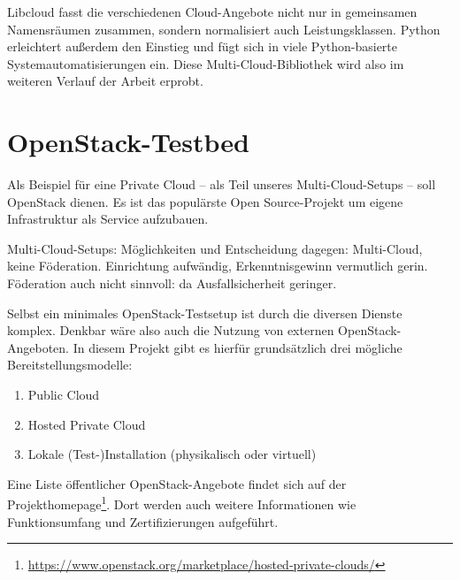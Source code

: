 \noindent Libcloud fasst die verschiedenen Cloud-Angebote nicht nur in gemeinsamen Namensräumen zusammen, sondern normalisiert auch Leistungsklassen. Python erleichtert außerdem den Einstieg und fügt sich in viele Python-basierte Systemautomatisierungen ein. Diese Multi-Cloud-Bibliothek wird also im weiteren Verlauf der Arbeit erprobt.


\section{OpenStack-Testbed}

Als Beispiel für eine Private Cloud -- als Teil unseres Multi-Cloud-Setups -- soll OpenStack dienen. Es ist das populärste Open Source-Projekt um eigene Infrastruktur als Service aufzubauen. 


Multi-Cloud-Setups: Möglichkeiten und Entscheidung dagegen: Multi-Cloud, keine Föderation. Einrichtung aufwändig, Erkenntnisgewinn vermutlich gerin. Föderation auch nicht sinnvoll: da Ausfallsicherheit geringer.\todo{}

Selbst ein minimales OpenStack-Testsetup ist durch die diversen Dienste komplex. Denkbar wäre also auch die Nutzung von externen OpenStack-Angeboten. In diesem Projekt gibt es hierfür grundsätzlich drei mögliche Bereitstellungsmodelle:

\begin{enumerate}
	\item Public Cloud
	\item Hosted Private Cloud
	\item Lokale (Test-)Installation (physikalisch oder virtuell)
\end{enumerate}

\noindent Eine Liste öffentlicher OpenStack-Angebote findet sich auf der Projekthomepage\footnote{\url{https://www.openstack.org/marketplace/hosted-private-clouds/}}. Dort werden auch weitere Informationen wie Funktionsumfang und Zertifizierungen aufgeführt. 

